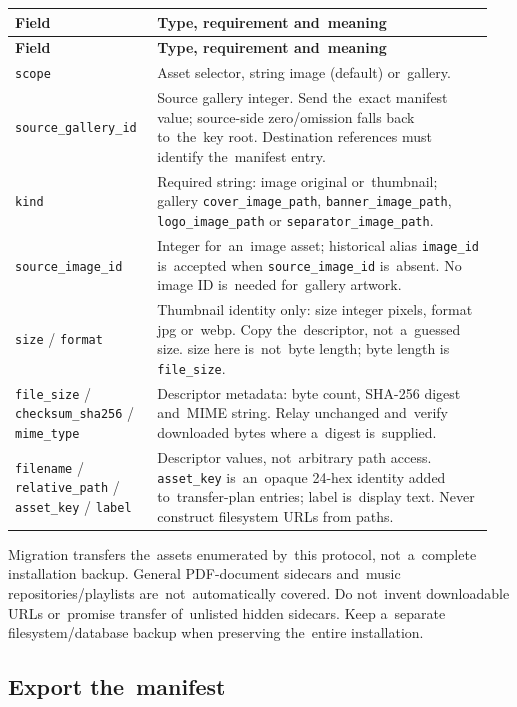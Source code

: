 \documentclass[11pt,a4paper]{article}
\newcommand{\codeword}[1]{\nolinkurl{#1}}
\begin{document}
\begin{longtable}{@{}>{\RaggedRight\arraybackslash}p{0.28\linewidth}>{\RaggedRight\arraybackslash}p{0.67\linewidth}@{}}
\toprule
\textbf{Field} & \textbf{Type, requirement and~meaning} \\
\midrule
\endfirsthead
\toprule
\textbf{Field} & \textbf{Type, requirement and~meaning} \\
\midrule
\endhead
\bottomrule
\endfoot
\codeword{scope} & Asset selector, string image (default) or~gallery. \\
\codeword{source_gallery_id} & Source gallery integer. Send the~exact manifest value;
source-side zero/omission falls back to~the~key root. Destination references must identify
the~manifest entry. \\
\codeword{kind} & Required string: image original or~thumbnail; gallery
\codeword{cover_image_path}, \codeword{banner_image_path}, \codeword{logo_image_path} or
\codeword{separator_image_path}. \\
\codeword{source_image_id} & Integer for~an~image asset; historical alias
\codeword{image_id} is~accepted when \codeword{source_image_id} is~absent. No image ID
is~needed for~gallery artwork. \\
\codeword{size} / \codeword{format} & Thumbnail identity only: size integer pixels, format
jpg or~webp. Copy the~descriptor, not~a~guessed size. size here is~not~byte length; byte
length is \codeword{file_size}. \\
\codeword{file_size} / \codeword{checksum_sha256} / \codeword{mime_type} & Descriptor
metadata: byte count, SHA-256 digest and~MIME string. Relay unchanged and~verify downloaded
bytes where a~digest is~supplied. \\
\codeword{filename} / \codeword{relative_path} / \codeword{asset_key} / \codeword{label} &
Descriptor values, not~arbitrary path access. \codeword{asset_key} is~an~opaque 24-hex
identity added to~transfer-plan entries; label is~display text. Never construct filesystem
URLs from paths. \\
\end{longtable}

Migration transfers the~assets enumerated by~this protocol, not~a~complete installation
backup. General PDF-document sidecars and~music repositories/playlists are~not~automatically
covered. Do not~invent downloadable URLs or~promise transfer of~unlisted hidden sidecars.
Keep a~separate filesystem/database backup when preserving the~entire installation.

\subsection{\texorpdfstring{Export the~manifest}{Export the manifest}}
\end{document}
